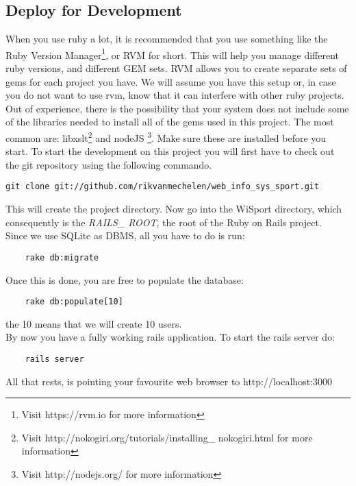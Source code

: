 \subsection{Deploy for Development}
When you use ruby a lot, it is recommended that you use something like the Ruby Version Manager\footnote{Visit https://rvm.io for more information}, or RVM for short. This will help you manage different ruby versions, and different GEM sets. RVM allows you to create separate sets of gems for each project you have. We will assume you have this setup or, in case you do not want to use rvm, know that it can interfere with other ruby projects.\\
Out of experience, there is the possibility that your system does not include some of the libraries needed to install all of the gems used in this project. The most common are: libxslt\footnote{Visit http://nokogiri.org/tutorials/installing\_ nokogiri.html for more information} and nodeJS \footnote{Visit http://nodejs.org/ for more information}. Make sure these are installed before you start.
To start the development on this project you will first have to check out the git repository using the following commando.
\begin{lstlisting}
git clone git://github.com/rikvanmechelen/web_info_sys_sport.git
\end{lstlisting}
This will create the project directory. Now go into the WiSport directory, which consequently is the \textit{RAILS\_ ROOT}, the root of the Ruby on Rails project.\\
Since we use SQLite as DBMS, all you have to do is run:
\begin{lstlisting}
	rake db:migrate
\end{lstlisting}
Once this is done, you are free to populate the database: 
\begin{lstlisting}
	rake db:populate[10]
\end{lstlisting}
the 10 means that we will create 10 users.\\
By now you have a fully working rails application.
To start the rails server do:
\begin{lstlisting}
	rails server
\end{lstlisting}
All that rests, is pointing your favourite web browser to http://localhost:3000
